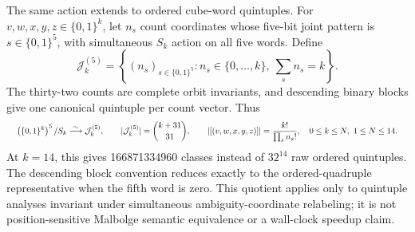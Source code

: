 \documentclass{article}
\newcommand{\fitmath}[1]{\resizebox{0.99\linewidth}{!}{$\displaystyle #1$}}
\begin{document}
The same action extends to ordered cube-word quintuples. For
$v,w,x,y,z\in\{0,1\}^k$, let $n_s$ count coordinates whose five-bit joint
pattern is $s\in\{0,1\}^5$, with simultaneous $S_k$ action on all five words.
Define
\[
  \mathcal{J}^{(5)}_k=\left\{(n_s)_{s\in\{0,1\}^5}:
    n_s\in\{0,\ldots,k\},\ \sum_s n_s=k\right\}.
\]
The thirty-two counts are complete orbit invariants, and descending binary
blocks give one canonical quintuple per count vector. Thus
\begin{equation}
  \fitmath{%
    \left(\{0,1\}^k\right)^5/S_k
      \overset{\sim}{\longrightarrow}\mathcal{J}^{(5)}_k,
    \qquad
    |\mathcal{J}^{(5)}_k|=\binom{k+31}{31},
    \qquad
    |[(v,w,x,y,z)]|=\frac{k!}{\prod_s n_s!},
    \quad 0\leq k\leq N,\ 1\leq N\leq14.
  }
  \label{eq:optimization-crazy-preimage-cube-ordered-quintuple-quotient}
\end{equation}
At $k=14$, this gives 166871334960 classes instead of $32^{14}$ raw ordered
quintuples. The descending block convention reduces exactly to the
ordered-quadruple representative when the fifth word is zero. This quotient
applies only to quintuple analyses invariant under simultaneous
ambiguity-coordinate relabeling; it is not position-sensitive Malbolge semantic
equivalence or a wall-clock speedup claim.
\end{document}
